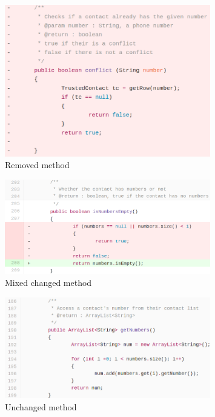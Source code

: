 \begin{figure}[!ht]
    \centering
        \includegraphics[width=0.80\textwidth]{images/deleted_method}
    \caption{Removed method}
    \label{fig:removed_method}
\end{figure}

\begin{figure}[!ht]
    \centering
        \includegraphics[width=0.80\textwidth]{images/simple_complex}
    \caption{Mixed changed method}
    \label{fig:changed_method}
\end{figure}

\begin{figure}[!ht]
    \centering
        \includegraphics[width=0.80\textwidth]{images/unchanged_example}
    \caption{Unchanged method}
    \label{fig:unchanged_method}
\end{figure}


